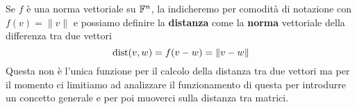 Se $f$ è una norma vettoriale su $\mathbb{F}^n$, la indicheremo per comodità di notazione con $f(v) = \| v \|$ e possiamo
definire la \textbf{distanza} come la \textbf{norma} vettoriale della differenza tra due vettori
\[ \operatorname{dist}(v, w) = f(v - w) = \| v - w \| \]
Questa non è l'unica funzione per il calcolo della distanza tra due vettori ma per il momento ci limitiamo ad
analizzare il funzionamento di questa per introdurre un concetto generale e per poi muoverci sulla distanza
tra matrici.